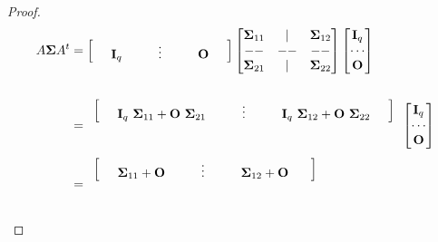 \documentclass[
]{book}
\theoremstyle{definition}
\theoremstyle{definition}
\theoremstyle{definition}
\theoremstyle{definition}
\theoremstyle{remark}
\begin{document}
\begin{proof}
\begin{align*}
A\mathbf{\Sigma} A^t&=\begin{bmatrix}
\hspace{0.5cm} \mathbf{I}_q \hspace{1.0cm} \vdots \hspace{1.0cm} \mathbf{O} \hspace{0.5cm}
 \end{bmatrix}\begin{bmatrix}
\mathbf{\Sigma}_{11} & | & \mathbf{\Sigma}_{12} \\
-- & -- & -- \\
\mathbf{\Sigma}_{21} & | & \mathbf{\Sigma}_{22}
\end{bmatrix}\begin{bmatrix}
\mathbf{I}_q \\ \cdots \\   \mathbf{O}  
 \end{bmatrix} \\
 &\\
&=\begin{array}{c}
\begin{bmatrix}
\hspace{0.5cm} \mathbf{I}_q \ \mathbf{\Sigma}_{11}+\mathbf{O}\ \mathbf{\Sigma}_{21}\hspace{1.0cm} \vdots  \hspace{1.0cm} \mathbf{I}_q \ \mathbf{\Sigma}_{12}+\mathbf{O}\ \mathbf{\Sigma}_{22} \hspace{0.5cm}
 \end{bmatrix}\\
 \\ \\
\end{array}  
 \begin{bmatrix}
\mathbf{I}_q \\ \cdots \\   \mathbf{O}  
 \end{bmatrix} \\
&=\begin{array}{c}
\begin{bmatrix}
\hspace{0.5cm}  \mathbf{\Sigma}_{11}+\mathbf{O} \hspace{1.0cm} \vdots  \hspace{1.0cm}  \mathbf{\Sigma}_{12}+\mathbf{O}\ \hspace{0.5cm}
 \end{bmatrix}\\
 \\ \\

\end{array}
\end{align*}
\end{proof}
\end{document}
